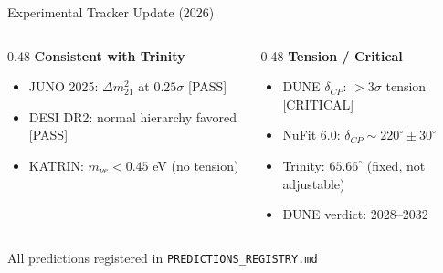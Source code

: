 \documentclass[aspectratio=169,11pt]{beamer}
\begin{document}
\begin{frame}{Experimental Tracker Update (2026)}
  \begin{columns}
    \begin{column}{0.48\textwidth}
      \textbf{Consistent with Trinity}
      \begin{itemize}
        \item JUNO 2025: $\Delta m^2_{21}$ at $0.25\sigma$ [PASS]
        \item DESI DR2: normal hierarchy favored [PASS]
        \item KATRIN: $m_{\nu e} < 0.45$ eV (no tension)
      \end{itemize}
    \end{column}
    \begin{column}{0.48\textwidth}
      \textbf{Tension / Critical}
      \begin{itemize}
        \item DUNE $\delta_{CP}$: $>$$3\sigma$ tension [CRITICAL]
        \item NuFit 6.0: $\delta_{CP} \sim 220^\circ \pm 30^\circ$
        \item Trinity: $65.66^\circ$ (fixed, not adjustable)
        \item DUNE verdict: 2028--2032
      \end{itemize}
    \end{column}
  \end{columns}
  \vfill
  \begin{center}
    \small All predictions registered in \texttt{PREDICTIONS\_REGISTRY.md}
  \end{center}
\end{frame}
\end{document}
